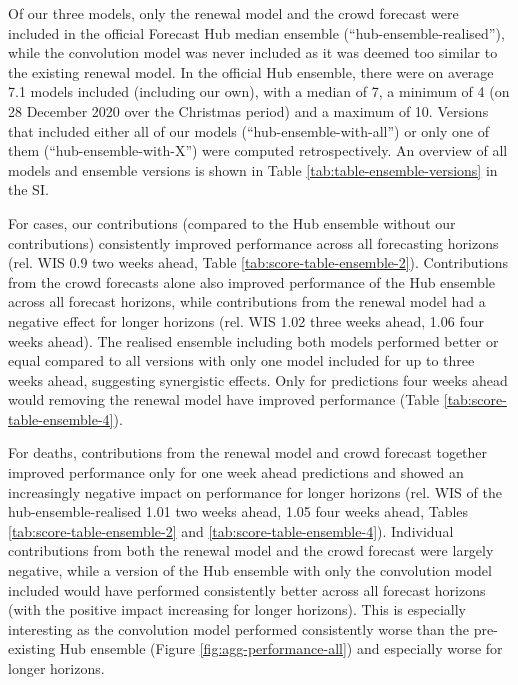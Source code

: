 \documentclass[
]{article}
\begin{document}
Of our three models, only the renewal model and the crowd forecast were included in the official Forecast Hub median ensemble (``hub-ensemble-realised''), while the convolution model was never included as it was deemed too similar to the existing renewal model. In the official Hub ensemble, there were on average 7.1 models included (including our own), with a median of 7, a minimum of 4 (on 28 December 2020 over the Christmas period) and a maximum of 10. Versions that included either all of our models (``hub-ensemble-with-all'') or only one of them (``hub-ensemble-with-X'') were computed retrospectively. An overview of all models and ensemble versions is shown in Table \ref{tab:table-ensemble-versions} in the SI.

For cases, our contributions (compared to the Hub ensemble without our contributions) consistently improved performance across all forecasting horizons (rel. WIS 0.9 two weeks ahead, Table \ref{tab:score-table-ensemble-2}). Contributions from the crowd forecasts alone also improved performance of the Hub ensemble across all forecast horizons, while contributions from the renewal model had a negative effect for longer horizons (rel. WIS 1.02 three weeks ahead, 1.06 four weeks ahead). The realised ensemble including both models performed better or equal compared to all versions with only one model included for up to three weeks ahead, suggesting synergistic effects. Only for predictions four weeks ahead would removing the renewal model have improved performance (Table \ref{tab:score-table-ensemble-4}).

For deaths, contributions from the renewal model and crowd forecast together improved performance only for one week ahead predictions and showed an increasingly negative impact on performance for longer horizons (rel. WIS of the hub-ensemble-realised 1.01 two weeks ahead, 1.05 four weeks ahead, Tables \ref{tab:score-table-ensemble-2} and \ref{tab:score-table-ensemble-4}). Individual contributions from both the renewal model and the crowd forecast were largely negative, while a version of the Hub ensemble with only the convolution model included would have performed consistently better across all forecast horizons (with the positive impact increasing for longer horizons). This is especially interesting as the convolution model performed consistently worse than the pre-existing Hub ensemble (Figure \ref{fig:agg-performance-all}) and especially worse for longer horizons.
\end{document}
